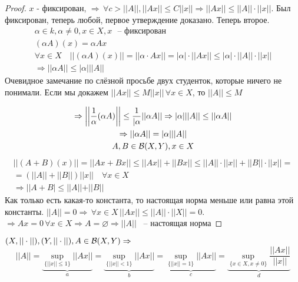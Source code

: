 \documentclass[document]{subfiles}
\begin{document}
\begin{proof}
    $x$ - фиксирован, $\Rightarrow \, \forall c > ||A||, ||Ax|| \leq C ||x|| \Rightarrow ||Ax|| \leq ||A|| \cdot ||x||$. Был фиксирован, теперь любой,
     первое утверждение доказано. Теперь второе. 
     \begin{gather*}
        \alpha \in k, \alpha \ne 0, x \in X, x \text{ ~-- фиксирован } \\
        (\alpha A) (x) = \alpha A x \\
        \forall x \in X \quad ||(\alpha A)(x) || = ||\alpha \cdot Ax|| = |\alpha| \cdot ||A x|| \leq |\alpha| \cdot ||A|| \cdot ||x|| \\
        \Rightarrow ||\alpha A|| \leq |\alpha| ||A||
     \end{gather*}
     Очевидное замечание по слёзной просьбе двух студенток, которые ничего не понимали.
     Если мы докажем $||Ax|| \leq M||x|| \, \forall x \in X$, то $||A|| \leq M$

     \begin{gather*}
        \Rightarrow \left| \left| \frac{1}{\alpha}(\alpha A) \right| \right| \leq \frac{1}{|\alpha} ||\alpha A|| \Rightarrow |\alpha| || A|| \leq ||\alpha A|| \\
        \Rightarrow ||\alpha A || = |\alpha| ||A|| \\
        A,B \in \mathcal{B}(X,Y), x \in X 
     \end{gather*}
     \begin{multline*}
        ||(A+B)(x)|| = ||Ax + Bx|| \leq ||Ax|| + ||Bx|| \leq ||A|| \cdot ||x|| + ||B|| \cdot ||x|| = \\
        = (||A|| + ||B||) ||x|| \quad \forall x \in X \\
        \Rightarrow ||A+B| \leq ||A||+ ||B||
     \end{multline*}
     Как только есть какая-то константа, то настоящая норма меньше или равна этой константы. $||A|| = 0 \Rightarrow \, \forall x \in X \, ||Ax|| \leq ||A|| \cdot ||X|| = 0$.
     $\Rightarrow Ax = 0 \, \forall x \in X \Rightarrow A = \varnothing \Rightarrow ||A||$ ~-- настоящая норма
\end{proof}

\begin{theorem}
    $(X, ||\cdot||), (Y, ||\cdot||), A \in \mathcal{B}(X,Y) \Rightarrow$ 
    \[ ||A|| = \underbrace{\sup_{\{||x|| \leq 1\}} ||Ax||}_a = \underbrace{\sup_{\{||x|| < 1\}} ||Ax||}_b = \underbrace{\sup_{\{||x|| = 1\}} ||Ax||}_c = \underbrace{\sup_{\{x \in X, x \ne 0\}} \frac{||Ax||}{||x||}}_d \]
\end{theorem} %
\end{document}
